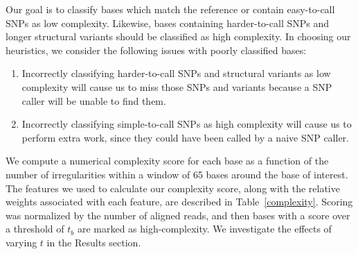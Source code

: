 \documentclass[10pt]{article}
\newcommand\TODO[1]{\textcolor{red}{TODO: #1}}
\begin{document}
Our goal is to classify bases which match the reference or contain easy-to-call SNPs as low complexity.
Likewise, bases containing harder-to-call SNPs and longer structural variants should be classified as high complexity.
In choosing our heuristics, we consider the following issues with poorly classified bases:
\begin{enumerate}
\item Incorrectly classifying harder-to-call SNPs and structural variants as low complexity will cause us to miss those SNPs and variants because a SNP caller will be unable to find them.
\item Incorrectly classifying simple-to-call SNPs as high complexity will cause us to perform extra work, since they could have been called by a naive SNP caller.
\end{enumerate}

We compute a numerical complexity score for each base as a function of the number of irregularities within a window of 65 bases around the base of interest.
The features we used to calculate our complexity score, along with the relative weights associated with each feature, are described in Table~\ref{complexity}.
Scoring was normalized by the number of aligned reads, and then bases with a score over a threshold of $t_b$ are marked as high-complexity.
We investigate the effects of varying $t$ in the Results section.
\end{document}
